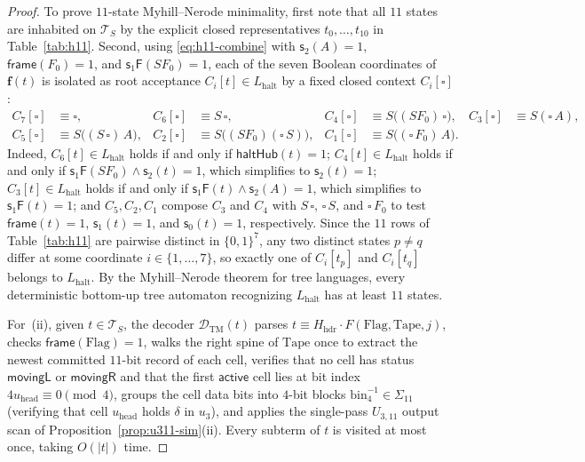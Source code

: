 \documentclass[11pt,reqno]{amsart}
\numberwithin{equation}{section}
\theoremstyle{plain}
\theoremstyle{definition}
\theoremstyle{remark}
\newcommand{\TS}{\mathcal{T}_S}
\begin{document}
\begin{proof}
To prove $11$-state Myhill--Nerode minimality, first note that all $11$ states are inhabited on $\TS$ by the explicit closed representatives $t_0, \dots, t_{10}$ in Table~\ref{tab:h11}. Second, using \eqref{eq:h11-combine} with $\mathsf{s}_2(A) = 1$, $\mathsf{frame}(F_0) = 1$, and $\mathsf{s}_1\mathsf{F}(S F_0) = 1$, each of the seven Boolean coordinates of $\mathbf{f}(t)$ is isolated as root acceptance $C_i[t] \in L_{\mathrm{halt}}$ by a fixed closed context $C_i[\square]$:
\begin{align*}
  C_7[\square] &\equiv \square, &
  C_6[\square] &\equiv S\,\square, &
  C_4[\square] &\equiv S\bigl((S F_0)\,\square\bigr), &
  C_3[\square] &\equiv S(\square\,A), \\
  C_5[\square] &\equiv S\bigl((S\,\square)\,A\bigr), &
  C_2[\square] &\equiv S\bigl((S F_0)(\square\,S)\bigr), &
  C_1[\square] &\equiv S\bigl((\square\,F_0)\,A\bigr).
\end{align*}
Indeed, $C_6[t] \in L_{\mathrm{halt}}$ holds if and only if $\mathsf{haltHub}(t) = 1$; $C_4[t] \in L_{\mathrm{halt}}$ holds if and only if $\mathsf{s}_1\mathsf{F}(S F_0) \land \mathsf{s}_2(t) = 1$, which simplifies to $\mathsf{s}_2(t) = 1$; $C_3[t] \in L_{\mathrm{halt}}$ holds if and only if $\mathsf{s}_1\mathsf{F}(t) \land \mathsf{s}_2(A) = 1$, which simplifies to $\mathsf{s}_1\mathsf{F}(t) = 1$; and $C_5, C_2, C_1$ compose $C_3$ and $C_4$ with $S\,\square$, $\square\,S$, and $\square\,F_0$ to test $\mathsf{frame}(t) = 1$, $\mathsf{s}_1(t) = 1$, and $\mathsf{s}_0(t) = 1$, respectively. Since the $11$ rows of Table~\ref{tab:h11} are pairwise distinct in $\{0,1\}^7$, any two distinct states $p \ne q$ differ at some coordinate $i \in \{1,\dots,7\}$, so exactly one of $C_i[t_p]$ and $C_i[t_q]$ belongs to $L_{\mathrm{halt}}$. By the Myhill--Nerode theorem for tree languages, every deterministic bottom-up tree automaton recognizing $L_{\mathrm{halt}}$ has at least $11$ states.

For~(ii), given $t \in \TS$, the decoder $\mathcal{D}_{\mathrm{TM}}(t)$ parses $t \equiv H_{\mathrm{hdr}} \cdot F(\mathrm{Flag}, \mathrm{Tape}, j)$, checks $\mathsf{frame}(\mathrm{Flag}) = 1$, walks the right spine of $\mathrm{Tape}$ once to extract the newest committed $11$-bit record of each cell, verifies that no cell has status $\mathsf{movingL}$ or $\mathsf{movingR}$ and that the first $\mathsf{active}$ cell lies at bit index $4 u_{\mathrm{head}} \equiv 0 \pmod 4$, groups the cell data bits into $4$-bit blocks $\mathrm{bin}_4^{-1} \in \Sigma_{11}$ (verifying that cell $u_{\mathrm{head}}$ holds $\delta$ in $u_3$), and applies the single-pass $U_{3,11}$ output scan of Proposition~\ref{prop:u311-sim}(ii). Every subterm of $t$ is visited at most once, taking $O(|t|)$ time.
\end{proof}
\end{document}
